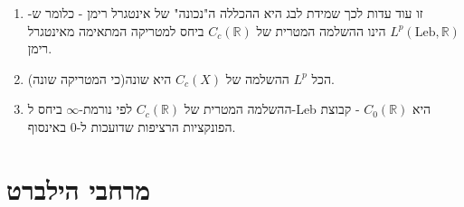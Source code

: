 \documentclass{tstextbook}
\begin{document}
\begin{remark}
  \begin{enumerate}
    \item זו עוד עדות לכך שמידת לבג היא ההכללה ה"נכונה" של אינטגרל רימן - כלומר ש-\(L^{p}\left( \text{Leb},\mathbb{R} \right)\) הינו ההשלמה המטרית של \(C_{c}\left( \mathbb{R} \right)\) ביחס למטריקה המתאימה מאינטגרל רימן. 


    \item הכל \(L^{p}\) ההשלמה של \(C_{c}(X)\) היא שונה(כי המטריקה שונה). 


    \item ההשלמה המטרית של \(C_{c}\left( \mathbb{R} \right)\) לפי נורמת-\(\infty\) ביחס ל-Leb היא \(C_{0}\left( \mathbb{R} \right)\) - קבוצת הפונקציות הרציפות שדועכות ל-0 באינסוף. 


  \end{enumerate}
\end{remark}
\section{מרחבי הילברט}
\end{document}

